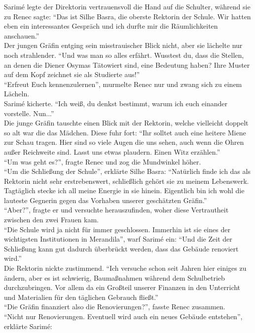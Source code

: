 Sarimé legte der Direktorin vertrauensvoll die Hand auf die Schulter, während sie zu Renec sagte: 
``Das ist Silhe Basra, die oberste Rektorin der Schule. Wir hatten eben ein interessantes Gespräch 
und ich durfte mir die Räumlichkeiten anschauen.''\\
Der jungen Gräfin entging sein misstrauischer Blick nicht, aber sie lächelte nur noch strahlender. 
``Und was man so alles erfährt. Wusstest du, dass die Stellen, an denen die Diener Osymas 
Tätowiert sind, eine Bedeutung haben? Ihre Muster auf dem Kopf zeichnet sie als Studierte aus!''\\
``Erfreut Euch kennenzulernen'', murmelte Renec nur und zwang sich zu einem Lächeln.\\
Sarimé kicherte. ``Ich weiß, du denkst bestimmt, warum ich euch einander vorstelle. Nun...''\\
Die junge Gräfin tauschte einen Blick mit der Rektorin, welche vielleicht doppelt so alt war die 
das Mädchen. Diese fuhr fort: ``Ihr solltet auch eine heitere Miene zur Schau tragen. Hier sind so 
viele Augen die uns sehen, auch wenn die Ohren außer Reichweite sind. Lasst uns etwas plaudern. 
Einen Witz erzählen.''\\
``Um was geht es?'', fragte Renec und zog die Mundwinkel höher.\\
``Um die Schließung der Schule'', erklärte Silhe Basra: ``Natürlich finde ich das als Rektorin 
nicht sehr erstrebenswert, schließlich gehört sie zu meinem Lebenswerk. Tagtäglich stecke ich all 
meine Energie in sie hinein. Eigentlich bin ich wohl die lauteste Gegnerin gegen das Vorhaben 
unserer geschätzten Gräfin.''\\
``Aber?'', fragte er und versuchte herauszufinden, woher diese Vertrautheit zwischen den zwei 
Frauen kam.\\
``Die Schule wird ja nicht für immer geschlossen. Immerhin ist sie eines der wichtigsten 
Institutionen in Merandila'', warf Sarimé ein: ``Und die Zeit der Schließung kann gut dadurch 
überbrückt werden, dass das Gebäude renoviert wird.''\\
Die Rektorin nickte zustimmend. ``Ich versuche schon seit Jahren hier einiges zu ändern, aber es 
ist schwierig, Baumaßnahmen während dem Schulbetrieb durchzubringen. Vor allem da ein Großteil 
unserer Finanzen in den Unterricht und Materialien für den täglichen Gebrauch fließt.''\\
``Die Gräfin finanziert also die Renovierungen?'', fasste Renec zusammen.\\
``Nicht nur Renovierungen. Eventuell wird auch ein neues Gebäude entstehen'', erklärte Sarimé: 
